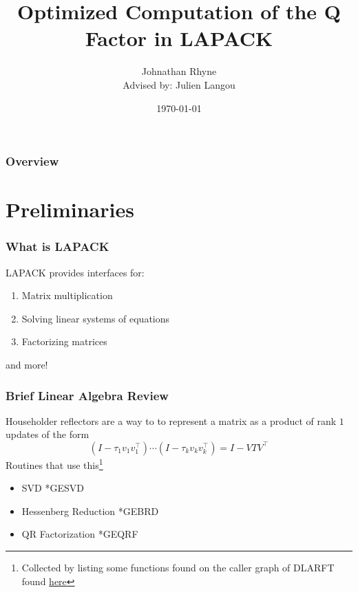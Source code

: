 \documentclass[12pt]{beamer}
\title{Optimized Computation of the Q Factor in LAPACK}
\author{Johnathan Rhyne\\Advised by: Julien Langou}
\institute{University of Colorado Denver}
\date{\today}
\begin{document}
    \begin{frame}
        \titlepage
    \end{frame}
    \begin{framefont}{\small}
    \begin{frame}
        \frametitle{Overview}
        \begin{multicols}{2}
            \tableofcontents
        \end{multicols}
    \end{frame}
    \end{framefont}
    \section{Preliminaries}
    \begin{frame}
        \frametitle{What is LAPACK}
        LAPACK provides interfaces for:
        \begin{enumerate}
            \item Matrix multiplication
            \item Solving linear systems of equations
            \item Factorizing matrices
        \end{enumerate}
        and more!
    \end{frame}
    \begin{frame}
        \frametitle{Brief Linear Algebra Review}
        Householder reflectors are a way to to represent a matrix as a product of rank $1$ updates of the form
        $$
            \left(I - \tau_1 v_1v_1^\top\right)\cdots\left(I - \tau_k v_kv_k^\top\right) = I - VTV^\top
        $$
        Routines that use this\footnote{Collected by listing some functions found on the caller graph of DLARFT found \textcolor{blue}{\href{https://netlib.org/lapack/explore-html//d7/d0d/group__larft_ga20e5a4f351b3ca7d30078547e55884f5_ga20e5a4f351b3ca7d30078547e55884f5_icgraph_org.svg}{here}}}
        \begin{itemize}
            \item SVD *GESVD
            \item Hessenberg Reduction *GEBRD
            \item QR Factorization *GEQRF
        \end{itemize}
    \end{frame}
\end{document}
